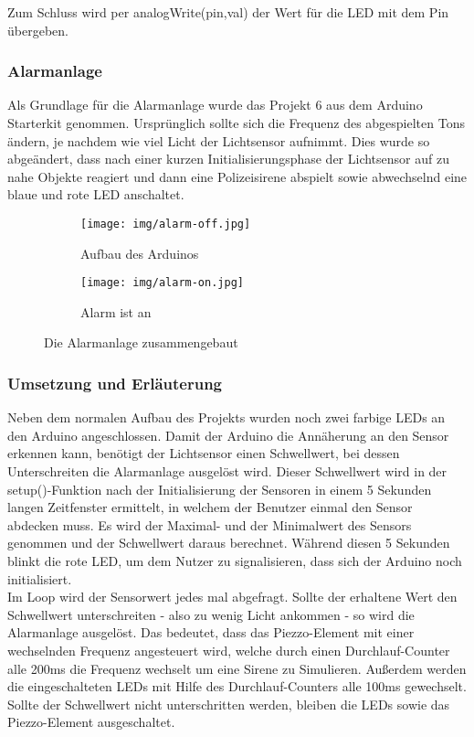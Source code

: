 Zum Schluss wird per analogWrite(pin,val) der Wert für die LED mit dem Pin übergeben.


\subsubsection{Alarmanlage}
Als Grundlage für die Alarmanlage wurde das Projekt 6 aus dem Arduino Starterkit genommen. Ursprünglich sollte sich die Frequenz des abgespielten Tons ändern, je nachdem wie viel Licht der Lichtsensor aufnimmt. Dies wurde so abgeändert, dass nach einer kurzen Initialisierungsphase der Lichtsensor auf zu nahe Objekte reagiert und dann eine Polizeisirene abspielt sowie abwechselnd eine blaue und rote LED anschaltet.

\begin{figure}[h]
	\centering
	\begin{subfigure}[b]{0.48\linewidth}
		\centering
		\texttt{[image: img/alarm-off.jpg]}
		\caption{Aufbau des Arduinos}
	\end{subfigure}\enspace%
	\begin{subfigure}[b]{0.48\linewidth}
		\centering
		\texttt{[image: img/alarm-on.jpg]}
		\caption{Alarm ist an}
	\end{subfigure}
	\caption{Die Alarmanlage zusammengebaut}
\end{figure}

\subsubsection{Umsetzung und Erläuterung}
Neben dem normalen Aufbau des Projekts wurden noch zwei farbige LEDs an den Arduino angeschlossen.
Damit der Arduino die Annäherung an den Sensor erkennen kann, benötigt der Lichtsensor einen Schwellwert, bei dessen Unterschreiten die Alarmanlage ausgelöst wird. Dieser Schwellwert wird in der setup()-Funktion nach der Initialisierung der Sensoren in einem 5 Sekunden langen Zeitfenster ermittelt, in welchem der Benutzer einmal den Sensor abdecken muss. Es wird der Maximal- und der Minimalwert des Sensors genommen und der Schwellwert daraus berechnet. Während diesen 5 Sekunden blinkt die rote LED, um dem Nutzer zu signalisieren, dass sich der Arduino noch initialisiert.\\
Im Loop wird der Sensorwert jedes mal abgefragt. Sollte der erhaltene Wert den Schwellwert unterschreiten - also zu wenig Licht ankommen - so wird die Alarmanlage ausgelöst. Das bedeutet, dass das Piezzo-Element mit einer wechselnden Frequenz angesteuert wird, welche durch einen Durchlauf-Counter alle 200ms die Frequenz wechselt um eine Sirene zu Simulieren. Außerdem werden die eingeschalteten LEDs mit Hilfe des Durchlauf-Counters alle 100ms gewechselt.
Sollte der Schwellwert nicht unterschritten werden, bleiben die LEDs sowie das Piezzo-Element ausgeschaltet.

